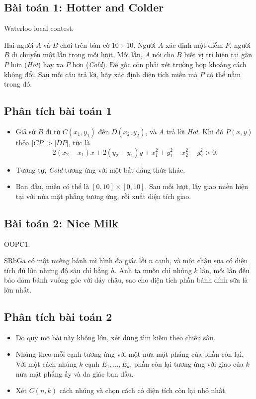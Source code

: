 \documentclass[11pt]{article}
\begin{document}
\subsection*{Bài toán 1: Hotter and Colder}

Waterloo local contest.

Hai người \(A\) và \(B\) chơi trên bàn cờ \(10\times 10\). Người \(A\) xác
định một điểm \(P\), người \(B\) di chuyển một lần trong mỗi lượt. Mỗi lần,
\(A\) nói cho \(B\) biết vị trí hiện tại gần \(P\) hơn (\textit{Hot}) hay xa
\(P\) hơn (\textit{Cold}). Đề gốc còn phải xét trường hợp khoảng cách không
đổi. Sau mỗi câu trả lời, hãy xác định diện tích miền mà \(P\) có thể nằm
trong đó.

\subsection*{Phân tích bài toán 1}

\begin{itemize}
  \item Giả sử \(B\) đi từ \(C(x_1,y_1)\) đến \(D(x_2,y_2)\), và \(A\) trả
  lời \textit{Hot}. Khi đó \(P(x,y)\) thỏa \(|CP|>|DP|\), tức là
  \[
    2(x_2-x_1)x+2(y_2-y_1)y+x_1^2+y_1^2-x_2^2-y_2^2>0.
  \]
  \item Tương tự, \textit{Cold} tương ứng với một bất đẳng thức khác.
  \item Ban đầu, miền có thể là \([0,10]\times[0,10]\). Sau mỗi lượt, lấy
  giao miền hiện tại với nửa mặt phẳng tương ứng, rồi xuất diện tích giao.
\end{itemize}

\subsection*{Bài toán 2: Nice Milk}

OOPC1.

SRbGa có một miếng bánh mì hình đa giác lồi \(n\) cạnh, và một chậu sữa có
diện tích đủ lớn nhưng độ sâu chỉ bằng \(h\). Anh ta muốn chỉ nhúng \(k\) lần,
mỗi lần đều bảo đảm bánh vuông góc với đáy chậu, sao cho diện tích phần bánh
dính sữa là lớn nhất.

\subsection*{Phân tích bài toán 2}

\begin{itemize}
  \item Do quy mô bài này không lớn, xét dùng tìm kiếm theo chiều sâu.
  \item Nhúng theo mỗi cạnh tương ứng với một nửa mặt phẳng của phần còn lại.
  Với một cách nhúng \(k\) cạnh \(E_1,\ldots,E_k\), phần còn lại tương ứng
  với giao của \(k\) nửa mặt phẳng ấy và đa giác ban đầu.
  \item Xét \(C(n,k)\) cách nhúng và chọn cách có diện tích còn lại nhỏ nhất.
\end{itemize}
\end{document}
